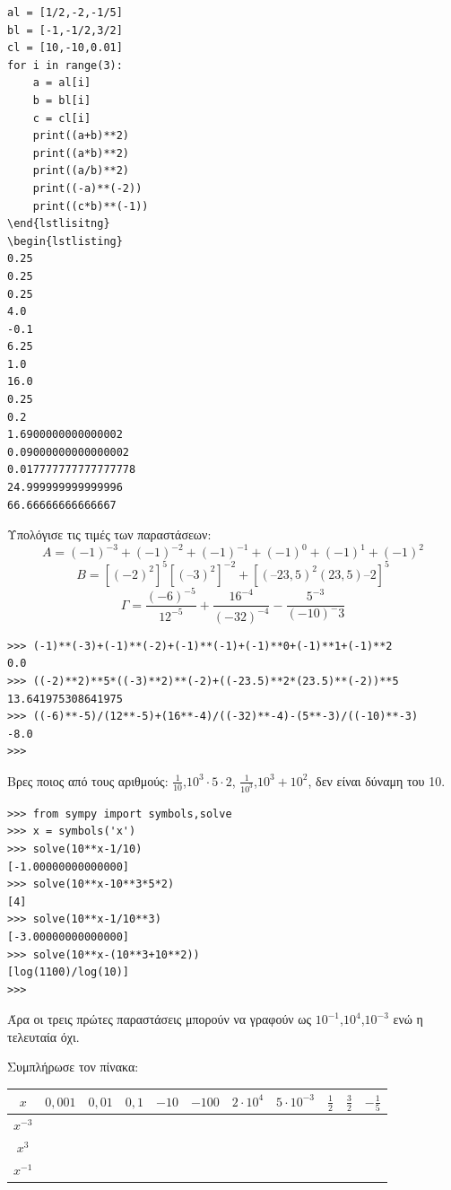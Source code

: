 \begin{lstlisting}
al = [1/2,-2,-1/5]
bl = [-1,-1/2,3/2]
cl = [10,-10,0.01]
for i in range(3):
    a = al[i]
    b = bl[i]
    c = cl[i]
    print((a+b)**2)
    print((a*b)**2)
    print((a/b)**2)
    print((-a)**(-2))
    print((c*b)**(-1))
\end{lstlisitng}
\begin{lstlisting}
0.25
0.25
0.25
4.0
-0.1
6.25
1.0
16.0
0.25
0.2
1.6900000000000002
0.09000000000000002
0.017777777777777778
24.999999999999996
66.66666666666667
\end{lstlisting}
\begin{exercise}
Υπολόγισε τις τιμές των παραστάσεων:
$$Α = (-1)^{-3}+(-1)^{-2}+(-1)^{-1}+(-1)^0+(-1)^1+(-1)^2$$
$$Β = [(-2)^2]^5[(–3)^2]^{-2}+[(–23,5)^2(23,5)–2]^5$$
$$\Gamma = \frac{(-6)^{-5}}{12^{-5}}+\frac{16^{-4}}{(-32)^{-4}}-\frac{5^{-3}}{(-10)^-3}$$
\end{exercise}
\begin{lstlisting}
>>> (-1)**(-3)+(-1)**(-2)+(-1)**(-1)+(-1)**0+(-1)**1+(-1)**2
0.0
>>> ((-2)**2)**5*((-3)**2)**(-2)+((-23.5)**2*(23.5)**(-2))**5
13.641975308641975
>>> ((-6)**-5)/(12**-5)+(16**-4)/((-32)**-4)-(5**-3)/((-10)**-3)
-8.0
>>>
\end{lstlisting}
\begin{exercise}
Βρες ποιος από τους αριθμούς: $\frac{1}{10}$,$10^3\cdot 5 \cdot 2$, $\frac{1}{10^3}$,$10^3+10^2$, δεν είναι δύναμη του 10.
\end{exercise}
\begin{lstlisting}
>>> from sympy import symbols,solve
>>> x = symbols('x')
>>> solve(10**x-1/10)
[-1.00000000000000]
>>> solve(10**x-10**3*5*2)
[4]
>>> solve(10**x-1/10**3)
[-3.00000000000000]
>>> solve(10**x-(10**3+10**2))
[log(1100)/log(10)]
>>>
\end{lstlisting}
Άρα οι τρεις πρώτες παραστάσεις μπορούν να γραφούν ως $10^{-1}$,$10^4$,$10^{-3}$ ενώ η τελευταία όχι.
\begin{exercise}
Συμπλήρωσε τον πίνακα:
\begin{table}[ht]
\begin{tabular}{|c|c|c|c|c|c|c|c|c|c|c|}
\hline
$x$        &$0,001$&$0,01$&$0,1$&$ -10$&$ -100$&$ 2\cdot 10^4$& $5\cdot 10^{-3}$&$\frac{1}{2}$&$\frac{3}{2}$&$-\frac{1}{5}$\\\hline
$x^{-3}$ &&&&&&&&&&\\\hline
$x^3$ &&&&&&&&&&\\\hline
$x^{-1}$ &&&&&&&&&&\\\hline
\end{tabular}
\end{table}
\end{exercise}
